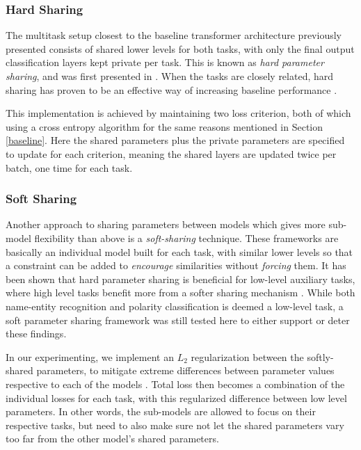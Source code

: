 \documentclass[11pt,a4paper]{article}
\begin{document}
\subsubsection{Hard Sharing}
\label{hardshare}
The multitask setup closest to the baseline transformer architecture previously presented consists of shared lower levels for both tasks, with only the final output classification layers kept private per task. This is known as \textit{hard parameter sharing}, and was first presented in \citealt{Caruana1993MultitaskLA}. When the tasks are closely related, hard sharing has proven to be an effective way of increasing baseline performance \cite{MTLNEG}. 

This implementation is achieved by maintaining two loss criterion, both of which using a cross entropy algorithm for the same reasons mentioned in Section \ref{baseline}. Here the shared parameters plus the private parameters are specified to update for each criterion, meaning the shared layers are updated twice per batch, one time for each task. 


\subsubsection{Soft Sharing}
\label{softshare}
Another approach to sharing parameters between models which gives more sub-model flexibility than above is a \textit{soft-sharing} technique. These frameworks are basically an individual model built for each task, with similar lower levels so that a constraint can be added to \textit{encourage} similarities without \textit{forcing} them. It has been shown that hard parameter sharing is beneficial for low-level auxiliary tasks, where high level tasks benefit more from a softer sharing mechanism \cite{sanh2018hierarchical}. While both name-entity recognition and polarity classification is deemed a low-level task, a soft parameter sharing framework was still tested here to either support or deter these findings. 

In our experimenting, we implement an $L_2$ regularization between the softly-shared parameters, to mitigate extreme differences between parameter values respective to each of the models \cite{parametershareblogpost}. Total loss then becomes a combination of the individual losses for each task, with this regularized difference between low level parameters. In other words, the sub-models are allowed to focus on their respective tasks, but need to also make sure not let the shared parameters vary too far from the other model's shared parameters. 
\end{document}

